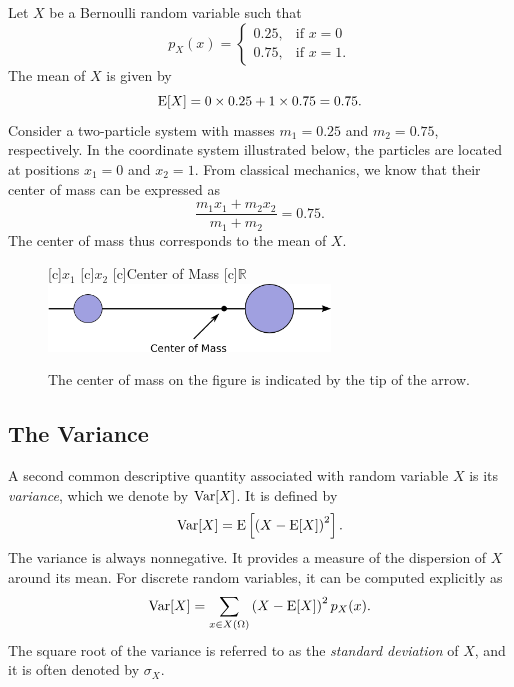 \begin{example}
Let $X$ be a Bernoulli random variable such that
\begin{equation*}
p_X (x) = \left\{ \begin{array}{ll}
0.25, & \text{if }x = 0 \\
0.75, & \text{if }x = 1.
\end{array} \right.
\end{equation*}
The mean of $X$ is given by
\begin{equation*}
\mathrm{E} [X] = 0 \times 0.25 + 1 \times 0.75 = 0.75 .
\end{equation*}
Consider a two-particle system with masses $m_1 = 0.25$ and $m_2 = 0.75$, respectively.
In the coordinate system illustrated below, the particles are located at positions $x_1 = 0$ and $x_2 = 1$.
From classical mechanics, we know that their center of mass can be expressed as
\begin{equation*}
\frac{ m_1 x_1 + m_2 x_2 }{ m_1 + m_2 } = 0.75 .
\end{equation*}
The center of mass thus corresponds to the mean of $X$.

\begin{figure}[ht]
\begin{center}
\begin{psfrags}
[c]{$x_1$}
[c]{$x_2$}
[c]{Center of Mass}
[c]{$\mathbb{R}$}
\includegraphics[height=1.8cm]{Figures/6Chapter/mass}
\end{psfrags}
\end{center}
\caption{The center of mass on the figure is indicated by the tip of the arrow.}
\end{figure}
\end{example}


\subsection{The Variance}

A second common descriptive quantity associated with random variable $X$ is its \emph{variance}, which we denote by $\mathrm{Var} [X]$. 
It is defined by
\begin{equation} \label{equation:VarianceExplicit}
\mathrm{Var} [X] = \mathrm{E} \left[ \left( X - \mathrm{E} [X] \right)^2 \right] .
\end{equation}
The variance is always nonnegative.
It provides a measure of the dispersion of $X$ around its mean.
For discrete random variables, it can be computed explicitly as
\begin{equation*}
\mathrm{Var} [X] = \sum_{x \in X(\Omega)} \left( X - \mathrm{E} [X] \right)^2 p_X (x) .
\end{equation*}
The square root of the variance is referred to as the \emph{standard deviation} of $X$, and it is often denoted by $\sigma_X$. 

